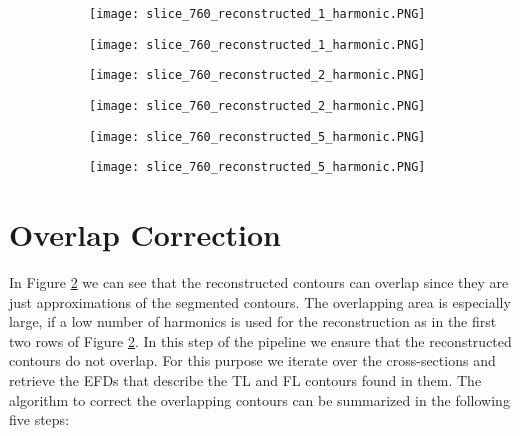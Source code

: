 \documentclass[thesis.tex]{subfiles}
\begin{document}
\begin{figure}
	\begin{subfigure}[t]{0.45\textwidth}
		\texttt{[image: slice\_760\_reconstructed\_1\_harmonic.PNG]}
	\caption{}
\label{fig:efds_reconstruction_a}		
	\end{subfigure}
\hspace{0.1\textwidth}
	\begin{subfigure}[t]{0.45\textwidth}
		\texttt{[image: slice\_760\_reconstructed\_1\_harmonic.PNG]}		
\caption{}	
	\end{subfigure}
	\begin{subfigure}[t]{0.45\textwidth}
		\texttt{[image: slice\_760\_reconstructed\_2\_harmonic.PNG]}
	\caption{}		
	\end{subfigure}
\hspace{0.1\textwidth}
	\begin{subfigure}[t]{0.45\textwidth}
		\texttt{[image: slice\_760\_reconstructed\_2\_harmonic.PNG]}		
\caption{}	
	\end{subfigure}
	\begin{subfigure}[t]{0.45\textwidth}
		\texttt{[image: slice\_760\_reconstructed\_5\_harmonic.PNG]}
	\caption{}		
	\end{subfigure}
\hspace{0.1\textwidth}
	\begin{subfigure}[t]{0.45\textwidth}
		\texttt{[image: slice\_760\_reconstructed\_5\_harmonic.PNG]}		
\caption{}	
	\end{subfigure}
	\caption{}

\label{fig:efds_reconstruction}
\end{figure}

\section{Overlap Correction}
In Figure \ref{fig:efds_reconstruction} we can see that the reconstructed contours can overlap since they are just approximations of the segmented contours. The overlapping area is especially large, if a low number of harmonics is used for the reconstruction as in the first two rows of Figure \ref{fig:efds_reconstruction}. In this step of the pipeline we ensure that the reconstructed contours do not overlap. For this purpose we iterate over the cross-sections and retrieve the EFDs that describe the TL and FL contours found in them. The algorithm to correct the overlapping contours can be summarized in the following five steps:
\end{document}
